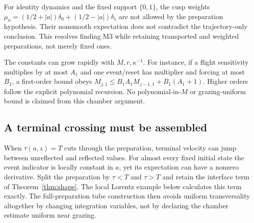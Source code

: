 For identity dynamics and the fixed support $\{0,1\}$, the cusp weights
$\mu_a=(1/2+|a|)\delta_0+(1/2-|a|)\delta_1$ are not allowed by the preparation hypothesis. Their nonsmooth expectation does not contradict the trajectory-only conclusion. This resolves finding M3 while retaining transported and weighted preparations, not merely fixed ones.

The constants can grow rapidly with $M,r,\kappa^{-1}$. For instance, if a flight sensitivity multiplies by at most $A_1$ and one event/reset has multiplier and forcing at most $B_1$, a first-order bound obeys
$M_{j,1}\le B_1A_1M_{j-1,1}+B_1(A_1+1)$.
Higher orders follow the explicit polynomial recursion. No polynomial-in-$M$ or grazing-uniform bound is claimed from this chamber argument.

\subsection{A terminal crossing must be assembled}
When $\tau(a,z)=T$ cuts through the preparation, terminal velocity can jump between unreflected and reflected values. For almost every fixed initial state the event indicator is locally constant in $a$, yet its expectation can have a nonzero derivative. Split the preparation by $\tau<T$ and $\tau>T$ and retain the interface term of Theorem~\ref{thm:shape}. The local Lorentz example below calculates this term exactly. The full-preparation tube construction then avoids uniform transversality altogether by changing integration variables, not by declaring the chamber estimate uniform near grazing.
\par
